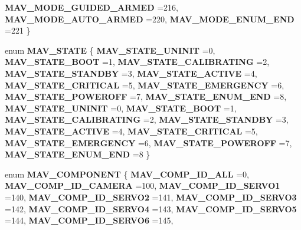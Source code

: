 \begin{DoxyCompactItemize}
\textbf{ M\+A\+V\+\_\+\+M\+O\+D\+E\+\_\+\+G\+U\+I\+D\+E\+D\+\_\+\+A\+R\+M\+ED} =216, 
\textbf{ M\+A\+V\+\_\+\+M\+O\+D\+E\+\_\+\+A\+U\+T\+O\+\_\+\+A\+R\+M\+ED} =220, 
\textbf{ M\+A\+V\+\_\+\+M\+O\+D\+E\+\_\+\+E\+N\+U\+M\+\_\+\+E\+ND} =221
 \}
\item 
enum \textbf{ M\+A\+V\+\_\+\+S\+T\+A\+TE} \{ \newline
\textbf{ M\+A\+V\+\_\+\+S\+T\+A\+T\+E\+\_\+\+U\+N\+I\+N\+IT} =0, 
\textbf{ M\+A\+V\+\_\+\+S\+T\+A\+T\+E\+\_\+\+B\+O\+OT} =1, 
\textbf{ M\+A\+V\+\_\+\+S\+T\+A\+T\+E\+\_\+\+C\+A\+L\+I\+B\+R\+A\+T\+I\+NG} =2, 
\textbf{ M\+A\+V\+\_\+\+S\+T\+A\+T\+E\+\_\+\+S\+T\+A\+N\+D\+BY} =3, 
\newline
\textbf{ M\+A\+V\+\_\+\+S\+T\+A\+T\+E\+\_\+\+A\+C\+T\+I\+VE} =4, 
\textbf{ M\+A\+V\+\_\+\+S\+T\+A\+T\+E\+\_\+\+C\+R\+I\+T\+I\+C\+AL} =5, 
\textbf{ M\+A\+V\+\_\+\+S\+T\+A\+T\+E\+\_\+\+E\+M\+E\+R\+G\+E\+N\+CY} =6, 
\textbf{ M\+A\+V\+\_\+\+S\+T\+A\+T\+E\+\_\+\+P\+O\+W\+E\+R\+O\+FF} =7, 
\newline
\textbf{ M\+A\+V\+\_\+\+S\+T\+A\+T\+E\+\_\+\+E\+N\+U\+M\+\_\+\+E\+ND} =8, 
\textbf{ M\+A\+V\+\_\+\+S\+T\+A\+T\+E\+\_\+\+U\+N\+I\+N\+IT} =0, 
\textbf{ M\+A\+V\+\_\+\+S\+T\+A\+T\+E\+\_\+\+B\+O\+OT} =1, 
\textbf{ M\+A\+V\+\_\+\+S\+T\+A\+T\+E\+\_\+\+C\+A\+L\+I\+B\+R\+A\+T\+I\+NG} =2, 
\newline
\textbf{ M\+A\+V\+\_\+\+S\+T\+A\+T\+E\+\_\+\+S\+T\+A\+N\+D\+BY} =3, 
\textbf{ M\+A\+V\+\_\+\+S\+T\+A\+T\+E\+\_\+\+A\+C\+T\+I\+VE} =4, 
\textbf{ M\+A\+V\+\_\+\+S\+T\+A\+T\+E\+\_\+\+C\+R\+I\+T\+I\+C\+AL} =5, 
\textbf{ M\+A\+V\+\_\+\+S\+T\+A\+T\+E\+\_\+\+E\+M\+E\+R\+G\+E\+N\+CY} =6, 
\newline
\textbf{ M\+A\+V\+\_\+\+S\+T\+A\+T\+E\+\_\+\+P\+O\+W\+E\+R\+O\+FF} =7, 
\textbf{ M\+A\+V\+\_\+\+S\+T\+A\+T\+E\+\_\+\+E\+N\+U\+M\+\_\+\+E\+ND} =8
 \}
\item 
enum \textbf{ M\+A\+V\+\_\+\+C\+O\+M\+P\+O\+N\+E\+NT} \{ \newline
\textbf{ M\+A\+V\+\_\+\+C\+O\+M\+P\+\_\+\+I\+D\+\_\+\+A\+LL} =0, 
\textbf{ M\+A\+V\+\_\+\+C\+O\+M\+P\+\_\+\+I\+D\+\_\+\+C\+A\+M\+E\+RA} =100, 
\textbf{ M\+A\+V\+\_\+\+C\+O\+M\+P\+\_\+\+I\+D\+\_\+\+S\+E\+R\+V\+O1} =140, 
\textbf{ M\+A\+V\+\_\+\+C\+O\+M\+P\+\_\+\+I\+D\+\_\+\+S\+E\+R\+V\+O2} =141, 
\newline
\textbf{ M\+A\+V\+\_\+\+C\+O\+M\+P\+\_\+\+I\+D\+\_\+\+S\+E\+R\+V\+O3} =142, 
\textbf{ M\+A\+V\+\_\+\+C\+O\+M\+P\+\_\+\+I\+D\+\_\+\+S\+E\+R\+V\+O4} =143, 
\textbf{ M\+A\+V\+\_\+\+C\+O\+M\+P\+\_\+\+I\+D\+\_\+\+S\+E\+R\+V\+O5} =144, 
\textbf{ M\+A\+V\+\_\+\+C\+O\+M\+P\+\_\+\+I\+D\+\_\+\+S\+E\+R\+V\+O6} =145, 

\end{DoxyCompactItemize}
